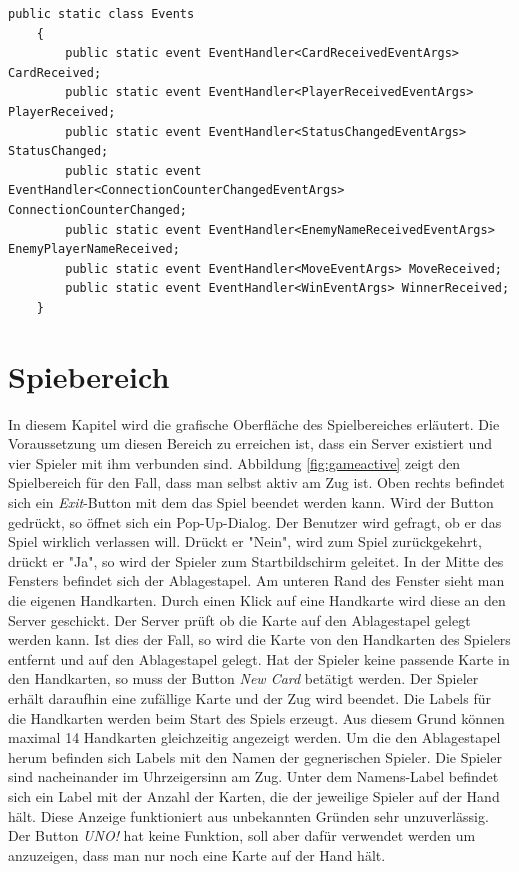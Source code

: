 \begin{lstlisting}[label=code:client-events, caption={Client Events}]
	public static class Events
	{
		public static event EventHandler<CardReceivedEventArgs> CardReceived;
		public static event EventHandler<PlayerReceivedEventArgs> PlayerReceived;
		public static event EventHandler<StatusChangedEventArgs> StatusChanged;
		public static event EventHandler<ConnectionCounterChangedEventArgs> ConnectionCounterChanged;
		public static event EventHandler<EnemyNameReceivedEventArgs> EnemyPlayerNameReceived;
		public static event EventHandler<MoveEventArgs> MoveReceived;
		public static event EventHandler<WinEventArgs> WinnerReceived;
	}	
\end{lstlisting}
\section{Spiebereich}
In diesem Kapitel wird die grafische Oberfläche des Spielbereiches erläutert. Die Voraussetzung um diesen Bereich zu erreichen ist, dass ein Server existiert und vier Spieler mit ihm verbunden sind. Abbildung \ref{fig:gameactive} zeigt den Spielbereich für den Fall, dass man selbst aktiv am Zug ist. Oben rechts befindet sich ein \textit{Exit}-Button mit dem das Spiel beendet werden kann. Wird der Button gedrückt, so öffnet sich ein Pop-Up-Dialog. Der Benutzer wird gefragt, ob er das Spiel wirklich verlassen will. Drückt er "Nein", wird zum Spiel zurückgekehrt, drückt er "Ja", so wird der Spieler zum Startbildschirm geleitet. In der Mitte des Fensters befindet sich der Ablagestapel. Am unteren Rand des Fenster sieht man die eigenen Handkarten. Durch einen Klick auf eine Handkarte wird diese an den Server geschickt. Der Server prüft ob die Karte auf den Ablagestapel gelegt werden kann. Ist dies der Fall, so wird die Karte von den Handkarten des Spielers entfernt und auf den Ablagestapel gelegt. Hat der Spieler keine passende Karte in den Handkarten, so muss der Button \textit{New Card} betätigt werden. Der Spieler erhält daraufhin eine zufällige Karte und der Zug wird beendet. Die Labels für die Handkarten werden beim Start des Spiels erzeugt. Aus diesem Grund können maximal 14 Handkarten gleichzeitig angezeigt werden. Um die den Ablagestapel herum befinden sich Labels mit den Namen der gegnerischen Spieler. Die Spieler sind nacheinander im Uhrzeigersinn  am Zug. Unter dem Namens-Label befindet sich ein Label mit der Anzahl der Karten, die der jeweilige Spieler auf der Hand hält. Diese Anzeige funktioniert aus unbekannten Gründen sehr unzuverlässig. Der Button \textit{UNO!} hat keine Funktion, soll aber dafür verwendet werden um anzuzeigen, dass man nur noch eine Karte auf der Hand hält. 

